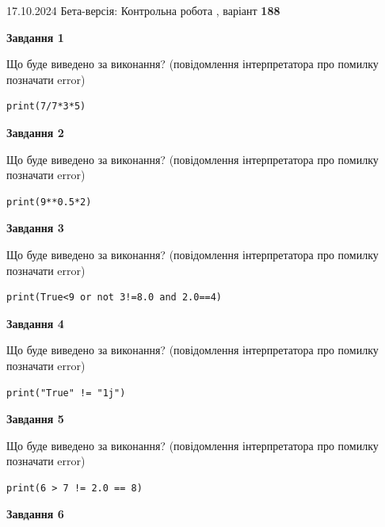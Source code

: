 \documentclass[12pt, ukrainian]{article}
\begin{document}
{\Large{17.10.2024 Бета-версія: Контрольна робота , варіант  \No \textbf { 188 }\par}}
{
\begin {large}
{\begin {center}\textbf{Завдання 1}\end {center}}

Що буде виведено за виконання? (повідомлення інтерпретатора про помилку позначати error)\par
\begin{verbatim}
print(7/7*3*5)
\end{verbatim}

{\begin {center}\textbf{Завдання 2}\end {center}}

Що буде виведено за виконання? (повідомлення інтерпретатора про помилку позначати error)\par
\begin{verbatim}
print(9**0.5*2)
\end{verbatim}

{\begin {center}\textbf{Завдання 3}\end {center}}

Що буде виведено за виконання? (повідомлення інтерпретатора про помилку позначати error)\par
\begin{verbatim}
print(True<9 or not 3!=8.0 and 2.0==4)
\end{verbatim}

{\begin {center}\textbf{Завдання 4}\end {center}}

Що буде виведено за виконання? (повідомлення інтерпретатора про помилку позначати error)\par
\begin{verbatim}
print("True" != "1j")
\end{verbatim}

{\begin {center}\textbf{Завдання 5}\end {center}}

Що буде виведено за виконання? (повідомлення інтерпретатора про помилку позначати error)\par
\begin{verbatim}
print(6 > 7 != 2.0 == 8)
\end{verbatim}

{\begin {center}\textbf{Завдання 6}\end {center}}


\end{large}}
\end{document}
